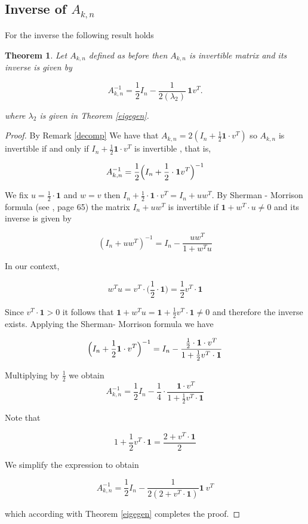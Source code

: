 \documentclass[11pt]{birkjour}
\newtheorem{thm}{Theorem}[section]
\theoremstyle{definition}
\theoremstyle{remark}
\numberwithin{equation}{section}
\begin{document}
\normalcolor 

\subsection{Inverse of $A_{k,n}$}\label{inversegen}
For the inverse the following result holds 

\begin{thm}\label{inverse}
Let $A_{k,n}$ defined as before then $A_{k,n}$ is invertible matrix and its inverse is given by

\[
A_{k,n}^{-1}=
\frac{1}{2} I_n -\frac{1}{2(\lambda_{2})}\,\mathbf{1}v^T.
\]

\noindent where $\lambda_2$ is given in Theorem \ref{eigegen}.
\end{thm}

\begin{proof}
By Remark \ref{decomp} We have that $A_{k,n}=2(I_{n}+\frac{1}{2}\mathbf{1}\cdot v^{T})$ so $A_{k,n}$ is invertible if and only if $I_{n}+\frac{1}{2}\mathbf{1}\cdot v^{T}$ is invertible , that is, 

\[A_{k,n}^{-1}=\frac{1}{2}\Bigl(I_{n}+ \frac{1}{2}\cdot \mathbf{1}v^{T}\Bigr)^{-1}\]

\noindent We fix $u=\frac{1}{2}\cdot \mathbf{1}$ and $w=v$ then $I_{n}+\frac{1}{2}\cdot \mathbf{1}\cdot v^{T}=I_{n}+uw^{T}$. By Sherman - Morrison formula (see \cite{GolubVanLoan}, page 65) the matrix $I_{n}+uw^{T}$ is invertible if $\mathbf{1}+w^{T}\cdot u\neq 0$ and its inverse is given by 

\[(I_{n}+uw^{T})^{-1}=I_{n}- \frac{uw^{T}}{1+w^{T}u}\]

\noindent  In our context, 

\[w^{T}u=v^{T}\cdot\Big(\frac{1}{2}\cdot \mathbf{1}\Big)=\frac{1}{2}v^{T}\cdot \mathbf{1}\]

\noindent  Since $v^{T}\cdot \mathbf{1}>0$ it follows that $\mathbf{1}+w^{T}u=\mathbf{1}+\frac{1}{2}v^{T}\cdot \mathbf{1}\neq 0$ and therefore the inverse exists. Applying the Sherman- Morrison formula we have 

\[\Bigl(I_{n}+\frac{1}{2} \mathbf{1}\cdot v^{T}\Bigr)^{-1}= I_{n}-\frac{\frac{1}{2}\cdot \mathbf{1}\cdot v^{T}}{1+\frac{1}{2}v^{T}\cdot \mathbf{1}}\]

\noindent Multiplying by $\frac{1}{2}$ we obtain 
\[A_{k,n}^{-1}=\frac{1}{2}I_{n}-\frac{1}{4}\cdot \frac{\mathbf{1}\cdot v^{T}}{1+\frac{1}{2}v^{T}\cdot \mathbf{1}}\]

\noindent Note that 

\[ 1+\frac{1}{2}v^{T}\cdot\mathbf{1}=\frac{2+v^{T}\cdot \mathbf{1}}{2}\]

\noindent We simplify the expression to obtain 

\[A_{k,n}^{-1}=\frac{1}{2}I_{n}-\frac{1}{2(2+v^{T}\cdot \mathbf{1})} \mathbf{1}\ v^{T}\]

\noindent which according with Theorem \ref{eigegen} completes the proof.
\end{proof}
\end{document}
